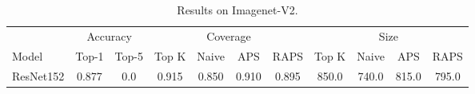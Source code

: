 \begin{table}[t]
    \centering
    \small
    \begin{tabular}{lcccccccccc}
    \toprule
     & \multicolumn{2}{c}{Accuracy}  & \multicolumn{4}{c}{Coverage} & \multicolumn{4}{c}{Size} \\ 
    \cmidrule(r){2-3}  \cmidrule(r){4-7}  \cmidrule(r){8-11}
    Model & Top-1 & Top-5 & Top K & Naive & APS & RAPS & Top K & Naive & APS & RAPS \\ 
    \midrule
     ResNet152 &  0.877 &  0.0 & 0.915 & 0.850 & 0.910 & 0.895 & 850.0 & 740.0 & 815.0 & 795.0 \\ 
    \bottomrule
    \end{tabular}
    \caption{Results on Imagenet-V2.} 
    \label{table:imagenet-v2}
    \end{table}
    